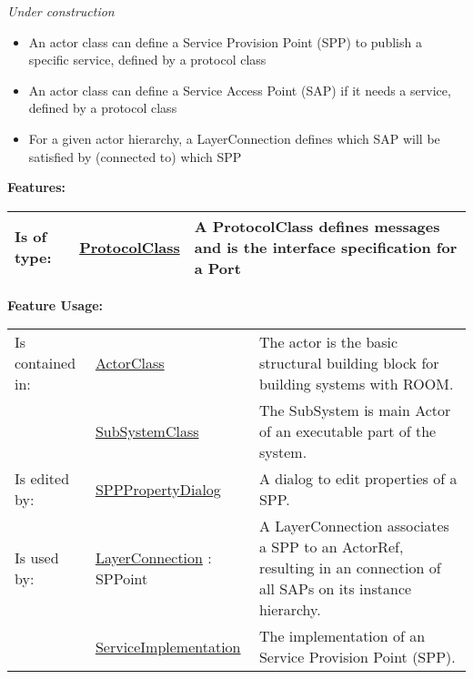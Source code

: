 	\emph{Under construction}
	\begin{itemize}
	\item An actor class can define a Service Provision Point (SPP) to publish a specific service, defined by a protocol class
	\item An actor class can define a Service Access Point (SAP) if it needs a service, defined by a protocol class
	\item For a given actor hierarchy, a LayerConnection defines which SAP will be satisfied by (connected to) which SPP
	\end{itemize}
		
		
	\begingroup
	\textbf{Features:}
	\renewcommand{\arraystretch}{1.8} %
	\begin{longtable}{l|l p{}}
		\hline
	Is of type: & \tabitem \hyperlink{ref:ProtocolClass}{ProtocolClass}  & A ProtocolClass defines messages and is the interface specification for a Port\\
	\hline
	\end{longtable}
	\endgroup
		
	\begingroup
	\textbf{Feature Usage:}
	\renewcommand{\arraystretch}{1.8} %
	\begin{longtable}{l|l p{}}
		\hline
	Is contained in: & \tabitem \hyperlink{ref:ActorClass}{ActorClass}  & The actor is the basic structural building block for building systems with ROOM.\\
	& \tabitem \hyperlink{ref:SubSystemClass}{SubSystemClass}  & The SubSystem is main Actor of an executable part of the system.  \\
	\hline
	Is edited by: & \tabitem \hyperlink{ref:SPPPropertyDialog}{SPPPropertyDialog}  & A dialog to edit properties of a SPP.\\
	\hline
	Is used by: & \tabitem \hyperlink{ref:LayerConnection}{LayerConnection} : SPPoint & A LayerConnection associates a SPP to an ActorRef, resulting in an connection of all SAPs on its instance hierarchy.\\
	& \tabitem \hyperlink{ref:ServiceImplementation}{ServiceImplementation}  & The implementation of an Service Provision Point (SPP). \\
	\hline
	\end{longtable}
	\endgroup
		
	
	\vspace{\baselineskip}
	\vspace{\baselineskip}
	\vspace{\baselineskip}
	
